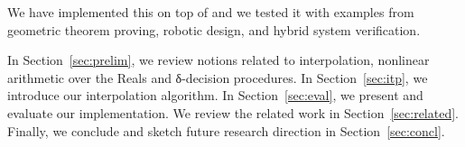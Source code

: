 
We have implemented this on top of \dReal
and we tested it with examples from geometric theorem proving, robotic design, and hybrid system verification.  

In Section~\ref{sec:prelim}, we review notions related to interpolation, nonlinear arithmetic over the Reals and δ-decision procedures.
In Section~\ref{sec:itp}, we introduce our interpolation algorithm.
In Section~\ref{sec:eval}, we present and evaluate our implementation.
We review the related work in Section~\ref{sec:related}.
Finally, we conclude and sketch future research direction in Section~\ref{sec:concl}.

